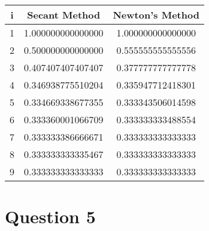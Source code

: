 \documentclass{article}
\begin{document}
\begin{center}
    \begin{tabular}{||c c c||} 
    \hline
    \textbf{i} & \textbf{Secant Method} & \textbf{Newton's Method}\\ [0.5ex] 
    \hline\hline
    1 & 1.000000000000000 & 1.000000000000000  \\ [1ex] 
    \hline
    2 & 0.500000000000000 & 0.555555555555556 \\ [1ex] 
    \hline
    3 & 0.407407407407407 & 0.377777777777778 \\ [1ex] 
    \hline
    4 & 0.346938775510204 & 0.335947712418301 \\ [1ex] 
    \hline
    5 & 0.334669338677355 & 0.333343506014598 \\ [1ex] 
    \hline
    6 & 0.333360001066709 & 0.333333333488554 \\ [1ex] 
    \hline
    7 & 0.333333386666671 & 0.333333333333333 \\ [1ex] 
    \hline
    8 & 0.333333333335467 & 0.333333333333333 \\ [1ex] 
    \hline
    9 & 0.333333333333333 & 0.333333333333333 \\ [1ex] 
    \hline
    \end{tabular}
\end{center}




\section*{Question 5}
\end{document}
